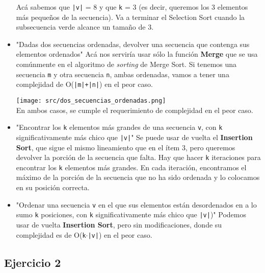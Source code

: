 \documentclass[12pt]{article}
\begin{document}
\begin{itemize}
\begin{center}
					Acá sabemos que \texttt{|v|} = 8 y que \texttt{k} = 3 (es decir, queremos los 3 elementos más pequeños de la secuencia). Va a terminar el Selection Sort cuando la subsecuencia verde alcance un tamaño de 3.
				\end{center}
			\item "Dadas dos secuencias ordenadas, devolver una secuencia que
contenga sus elementos ordenados" Acá nos serviría usar sólo la función \textbf{Merge} que se usa comúnmente en el algoritmo de \emph{sorting} de Merge Sort. Si tenemos una secuencia \texttt{m} y otra secuencia \texttt{n}, ambas ordenadas, vamos a tener una complejidad de O(\texttt{|m|+\texttt{|n|}}) en el peor caso.
				\begin{center}
					\texttt{[image: src/dos\_secuencias\_ordenadas.png]}\\
					
					En ambos casos, se cumple el requerimiento de complejidad en el peor caso.
				\end{center}
			\item "Encontrar los \texttt{k} elementos más grandes de una secuencia \texttt{v}, con \texttt{k} significativamente más chico que \texttt{|v|}" Se puede usar de vuelta el \textbf{Insertion Sort}, que sigue el mismo lineamiento que en el ítem 3, pero queremos devolver la porción de la secuencia que falta. Hay que hacer \texttt{k} iteraciones para encontrar los \texttt{k} elementos más grandes. En cada iteración, encontramos el máximo de la porción de la secuencia que no ha sido ordenada y lo colocamos en su posición correcta.
			\item "Ordenar una secuencia \texttt{v} en el que sus elementos están desordenados en a lo sumo \texttt{k} posiciones, con \texttt{k} significativamente más chico que \texttt{|v|})" Podemos usar de vuelta \textbf{Insertion Sort}, pero sin modificaciones, donde su complejidad es de O(\texttt{k}$\cdot$\texttt{|v|}) en el peor caso.
		\end{itemize}
		
	\subsection*{Ejercicio 2}
			
\end{document}
